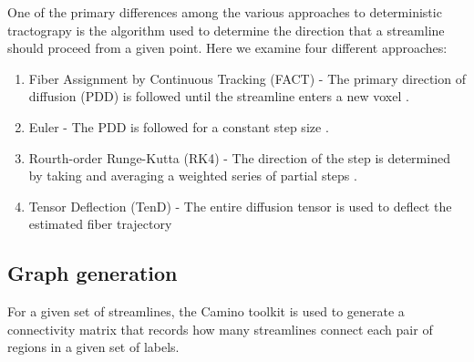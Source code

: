 \documentclass{frontiersSCNS} %
\begin{document}

One of the primary differences among the various approaches to
deterministic tractograpy is the algorithm used to determine the
direction that a streamline should proceed from a given point. Here we
examine four different approaches:

\begin{enumerate}
\item Fiber Assignment by Continuous Tracking (FACT) - The primary
  direction of diffusion (PDD) is followed until the streamline enters
  a new voxel \citep{Mori1999}.
\item Euler -  The PDD is followed for a constant step size \citep{Basser2000}.
\item Rourth-order Runge-Kutta (RK4) - The direction of the step is determined
 by taking and averaging a weighted series of partial steps \citep{Basser2000}.
\item Tensor Deflection (TenD) - The entire diffusion tensor is used to deﬂect
the estimated ﬁber trajectory \citep{Lazar2003}
\end{enumerate}


\subsection{Graph generation}
For a given set of streamlines, the Camino toolkit is used to generate
a connectivity matrix that records how many streamlines connect each pair of
regions in a given set of labels. 

\end{document}
